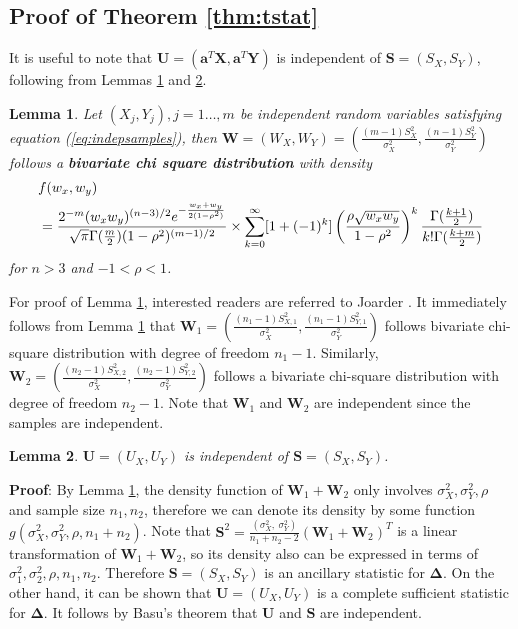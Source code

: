 \documentclass[review]{elsarticle}
\newtheorem{lemma}{Lemma}
\begin{document}
\subsection*{Proof of Theorem \ref{thm:tstat}}
It is useful to note that $\bm U = (\bm a^T\bm X, \bm a^T\bm 
Y)$ is independent of $\bm S = (S_X, S_Y)$,
following from Lemmas \ref{lemmabiChisq} and \ref{lemmaIndep}.
\begin{lemma}\label{lemmabiChisq}
	Let $(X_{j}, Y_{j}), j=1 \ldots,  m$ be independent random variables satisfying equation 
	(\ref{eq:indepsamples}),
	then $\bm W = (W_{X},W_{Y}) =(\frac{(m -1)S_{X}^2}{\sigma_X^2}, 
	\frac{(n-1)S_{Y}^2}{\sigma_Y^2})$ 
	follows a \textbf{bivariate chi square distribution} with density 
	\begin{equation}\label{biChisq}\notag
	\begin{aligned}
	&f(w_x, w_y) \\
	& = \frac{2^{-m}(w_xw_y)^{(n-3)/2}e^{-\frac{w_x +
				w_y}{2(1-\rho^2)}}}{\sqrt{\pi}\Gamma(\frac{m}{2})(1-\rho^2)^{(m-1)/2}} 
	\times  \sum_{k=0}^{\infty}[1 +
	(-1)^k]\left(\frac{\rho\sqrt{w_xw_y}}{1-\rho^2}\right)^k\frac{\Gamma(\frac{k+1}{2})}{k!\Gamma(\frac{k+
			m}{2})}
	\end{aligned}
	\end{equation}
	for $n>3$ and $-1<\rho < 1$.
\end{lemma}
For proof of Lemma \ref{lemmabiChisq}, interested readers are referred to 
Joarder \cite{joarder2009moments}.
It immediately follows from Lemma \ref{lemmabiChisq} that $\bm W_1 = (\frac{(n_1 -1)S_{X, 
		1}^2}{\sigma_X^2}, \frac{(n_1-1)S_{Y, 1}^2}{\sigma_Y^2})$ follows bivariate chi-square 
distribution with degree of freedom $n_1-1$. Similarly, $\bm W_2 =(\frac{(n_2 -1)S_{X, 
		2}^2}{\sigma_X^2}, \frac{(n_2-1)S_{Y, 2}^2}{\sigma_Y^2})$ follows a bivariate 
chi-square 
distribution with degree of freedom $n_2-1$.  Note that $\bm W_1$ and $\bm W_2$ are independent 
since the samples are independent. 

\begin{lemma}\label{lemmaIndep}
	$\bm U =(U_X, U_Y)$ is independent of $\bm S = (S_X ,S_Y)$.
\end{lemma}
\textbf{Proof}: By Lemma \ref{lemmabiChisq}, the density function of $
\bm W_1 + \bm W_2$ only involves $\sigma^2_X, \sigma^2_Y, \rho$ and sample size $n_1, n_2$, 
therefore
we can denote its density by some function $g(\sigma^2_X, \sigma^2_Y, \rho,
n_1 + n_2)$. Note that $\bm S^2 = \frac{(\sigma_X^2, ~\sigma^2_Y)}{n_1 +n_2 -2}(\bm W_1 + \bm 
W_2)^T $
is a linear transformation of $\bm W_1 + \bm W_2$, so its density also can be expressed in 
terms of $\sigma^2_1, \sigma^2_2, \rho, n_1, n_2$. Therefore $\bm S = (S_X ,S_Y)$ is an 
ancillary statistic for $\bm \Delta$. On the other hand, it can
be shown that $\bm U =(U_X, U_Y)$ is a complete sufficient statistic for $\bm \Delta$. It 
follows by
Basu's theorem that $\bm U$ and $\bm S$ are independent. 
\end{document}
